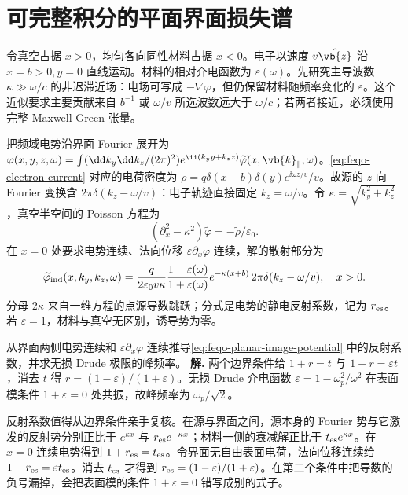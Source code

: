 \section{可完整积分的平面界面损失谱}
\label{chap:feqo-eels}

令真空占据 \(x>0\)，均匀各向同性材料占据 \(x<0\)。电子以速度 \(v\hat{\vb{z}}\) 沿 \(x=b>0,y=0\) 直线运动。材料的相对介电函数为 \(\varepsilon(\omega)\)。先研究主导波数 \(\kappa\gg\omega/c\) 的非迟滞近场：电场可写成 \(-\nabla\varphi\)，但仍保留材料随频率变化的 \(\varepsilon\)。这个近似要求主要贡献来自 \(b^{-1}\) 或 \(\omega/v\) 所选波数远大于 \(\omega/c\)；若两者接近，必须使用完整 Maxwell Green 张量。

把频域电势沿界面 Fourier 展开为 \(\varphi(x,y,z,\omega)=\int(\dd k_y\dd k_z/(2\pi)^2)e^{\ii(k_yy+k_zz)}\widetilde\varphi(x,\vb{k}_\parallel,\omega)\)。\cref{eq:feqo-electron-current} 对应的电荷密度为 \(\rho=q\delta(x-b)\delta(y)e^{\ii\omega z/v}/v\)。故源的 \(z\) 向 Fourier 变换含 \(2\pi\delta(k_z-\omega/v)\)：电子轨迹直接固定 \(k_z=\omega/v\)。令 \(\kappa=\sqrt{k_y^2+k_z^2}\)，真空半空间的 Poisson 方程为
\[
(\partial_x^2-\kappa^2)\widetilde\varphi=-\widetilde\rho/\varepsilon_0.
\]
在 \(x=0\) 处要求电势连续、法向位移 \(\varepsilon\partial_x\varphi\) 连续，解的散射部分为
\begin{equation}
\widetilde\varphi_{\rm ind}(x,k_y,k_z,\omega)
=\frac{q}{2\varepsilon_0v\kappa}
\frac{1-\varepsilon(\omega)}{1+\varepsilon(\omega)}
e^{-\kappa(x+b)}\,2\pi\delta(k_z-\omega/v),\quad x>0.
\label{eq:feqo-planar-image-potential}
\end{equation}
分母 \(2\kappa\) 来自一维方程的点源导数跳跃；分式是电势的静电反射系数，记为 \(r_{\rm es}\)。若 \(\varepsilon=1\)，材料与真空无区别，诱导势为零。


\par
\begin{workedexample}
从界面两侧电势连续和 \(\varepsilon\partial_x\varphi\) 连续推导\cref{eq:feqo-planar-image-potential} 中的反射系数，并求无损 Drude 极限的峰频率。
\textbf{解.} 两个边界条件给 \(1+r=t\) 与 \(1-r=\varepsilon t\)，消去 \(t\) 得 \(r=(1-\varepsilon)/(1+\varepsilon)\)。无损 Drude 介电函数 \(\varepsilon=1-\omega_p^2/\omega^2\) 在表面模条件 \(1+\varepsilon=0\) 处共振，故峰频率为 \(\omega_p/\sqrt2\)。
\end{workedexample}
\par
反射系数值得从边界条件亲手复核。在源与界面之间，源本身的 Fourier 势与它激发的反射势分别正比于 \(e^{\kappa x}\) 与 \(r_{\rm es}e^{-\kappa x}\)；材料一侧的衰减解正比于 \(t_{\rm es}e^{\kappa x}\)。在 \(x=0\) 连续电势得到 \(1+r_{\rm es}=t_{\rm es}\)。令界面无自由表面电荷，法向位移连续给 \(1-r_{\rm es}=\varepsilon t_{\rm es}\)。消去 \(t_{\rm es}\) 才得到 \(r_{\rm es}=(1-\varepsilon)/(1+\varepsilon)\)。在第二个条件中把导数的负号漏掉，会把表面模的条件 \(1+\varepsilon=0\) 错写成别的式子。

